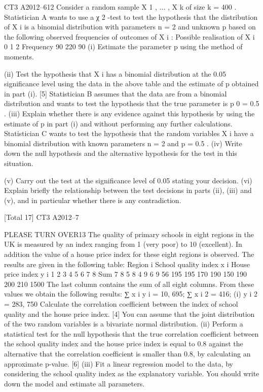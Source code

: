 \documentclass[a4paper,12pt]{article}
\begin{document}
\begin{enumerate}
CT3 A2012–612
Consider a random sample X 1 , ... , X k of size k = 400 . Statistician A wants to use a
χ 2 -test to test the hypothesis that the distribution of X i is a binomial distribution
with parameters n = 2 and unknown p based on the following observed frequencies
of outcomes of X i :
Possible realisation of X i 0 1 2
Frequency 90 220 90
(i) Estimate the parameter p using the method of moments.

(ii) Test the hypothesis that X i has a binomial distribution at the 0.05 significance
level using the data in the above table and the estimate of p obtained in
part (i).
[5]
Statistician B assumes that the data are from a binomial distribution and wants to test
the hypothesis that the true parameter is p 0 = 0.5 .
(iii)
Explain whether there is any evidence against this hypothesis by using the
estimate of p in part (i) and without performing any further calculations. 
Statistician C wants to test the hypothesis that the random variables X i have a
binomial distribution with known parameters n = 2 and p = 0.5 .
(iv) Write down the null hypothesis and the alternative hypothesis for the test in
this situation.

(v) Carry out the test at the significance level of 0.05 stating your decision.
(vi) Explain briefly the relationship between the test decisions in parts (ii), (iii) and
(v), and in particular whether there is any contradiction.

[Total 17]
CT3 A2012–7

PLEASE TURN OVER13
The quality of primary schools in eight regions in the UK is measured by an index
ranging from 1 (very poor) to 10 (excellent). In addition the value of a house price
index for these eight regions is observed. The results are given in the following table:
Region i
School quality index x i
House price index y i
1
2
3
4
5
6
7
8
Sum
7
8
5
8
4
9
6
9
56
195 195 170 190 150 190 200 210 1500
The last column contains the sum of all eight columns.
From these values we obtain the following results:
∑ x i y i = 10, 695; ∑ x i 2 = 416;
(i)
\sum y i 2 = 283, 750
Calculate the correlation coefficient between the index of school quality and
the house price index.
[4]
You can assume that the joint distribution of the two random variables is a bivariate
normal distribution.
(ii) Perform a statistical test for the null hypothesis that the true correlation
coefficient between the school quality index and the house price index is
equal to 0.8 against the alternative that the correlation coefficient is smaller
than 0.8, by calculating an approximate p-value.
[6]
(iii) Fit a linear regression model to the data, by considering the school quality
index as the explanatory variable. You should write down the model and
estimate all parameters.


\end{enumerate}
\end{document}
